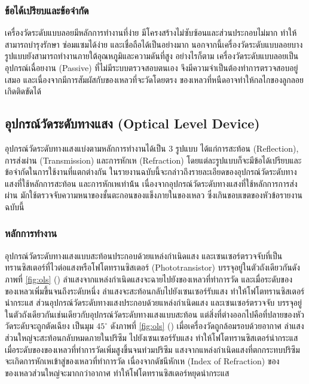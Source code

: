 \documentclass[final,11pt]{article}
\begin{document}
\subsubsection{ข้อได้เปรียบและข้อจำกัด}
เครื่องวัดระดับแบบลอยมีหลักการทำงานที่ง่าย มีโครงสร้างไม่ซับซ้อนและส่วนประกอบไม่มาก ทำให้สามารถบำรุงรักษา ซ่อมแซมได้ง่าย และเชื่อถือได้เป็นอย่างมาก
นอกจากนี้เครื่องวัดระดับแบบลอยบางรูปแบบยังสามารถทำงานภายใต้อุณหภูมิและความดันที่สูง อย่างไรก็ตาม เครื่องวัดระดับแบบลอยเป็นอุปกรณ์เฉื่อยงาน (Passive) 
ที่ไม่มีระบบตรวจสอบตนเอง จึงมีความจำเป็นต้องทำการตรวจสอบอยู่เสมอ และเนื่องจากมีการสัมผัสกับของเหลวที่จะวัดโดยตรง ของเหลวที่หนืดอาจทำให้กลไกของลูกลอยเกิดติดขัดได้

\subsection{อุปกรณ์วัดระดับทางแสง (Optical Level Device)}
อุปกรณ์วัดระดับทางแสงแบ่งตามหลักการทำงานได้เป็น 3 รูปแบบ ได้แก่การสะท้อน (Reflection), การส่งผ่าน (Transmission) และการหักเห (Refraction) 
โดยแต่ละรูปแบบก็จะมีข้อได้เปรียบและข้อจำกัดในการใช้งานที่แตกต่างกัน ในรายงานฉบับนี้จะกล่าวถึงรายละเอียดของอุปกรณ์วัดระดับทางแสงที่ใช้หลักการสะท้อน 
และการหักเหเท่าน้้น เนื่องจากอุปกรณ์วัดระดับทางแสงที่ใช้หลักการการส่งผ่าน มักใช้ตรวจจับความหนาของชั้นตะกอนของแข็งภายในของเหลว 
ซึ่งเกินขอบเขตของหัวข้อรายงานฉบับนี้

\subsubsection{หลักการทำงาน}
อุปกรณ์วัดระดับทางแสงแบบสะท้อนประกอบด้วยแหล่งกำเนิดแสง และเซนเซอร์ตรวจจับที่เป็นทรานซิสเตอร์ที่ไวต่อแสงหรือโฟโตทรานซิสเตอร์ (Phototransistor) 
บรรจุอยู่ในตัวถังเดียวกันดังภาพที่ \ref{fig:ols} () ลำแสงจากแหล่งกำเนิดแสงจะฉายไปยังของเหลวที่ทำการวัด และเมื่อระดับของของเหลวเพิ่มขึ้นจนถึงระดับหนึ่ง 
ลำแสงจะสะท้อนกลับไปยังเซนเซอร์รับแสง ทำให้โฟโตทรานซิสเตอร์นำกระแส ส่วนอุปกรณ์วัดระดับทางแสงประกอบด้วยแหล่งกำเนิดแสง 
และเซนเซอร์ตรวจจับ บรรจุอยู่ในตัวถังเดียวกันเช่นเดียวกับอุปกรณ์วัดระดับทางแสงแบบสะท้อน แต่สิ่งที่ต่างออกไปคือที่ปลายของหัววัดระดับจะถูกตัดเฉียง
เป็นมุม $45^\circ$ ดังภาพที่ \ref{fig:ols} () เมื่อเครื่องวัดถูกล้อมรอบด้วยอากาศ ลำแสงส่วนใหญ่จะสะท้อนกลับหมดภายในปริซึม ไปยังเซนเซอร์รับแสง ทำให้โฟโตทรานซิสเตอร์นำกระแส
เมื่อระดับของของเหลวที่ทำการวัดเพิ่มสูงขึ้นจนท่วมปริซึม แสงจากแหล่งกำเนิดแสงที่ตกกระทบปริซึมจะเกิดการหักเหเข้าสู่ของเหลวที่ทำการวัด เนื่องจากดัชนีหักเห
(Index of Refraction) ของของเหลวส่วนใหญ่จะมากกว่าอากาศ ทำให้โฟโตทรานซิสเตอร์หยุดนำกระแส
\end{document}
